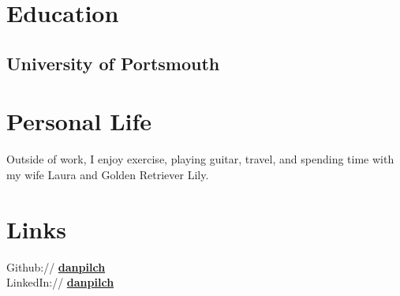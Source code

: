 \documentclass[]{resume}
\begin{document}
\begin{minipage}[t]{0.33\textwidth}

\section{Education}

\subsection{University of Portsmouth}
\sectionsep



\section{Personal Life}
Outside of work, I enjoy exercise, playing guitar, travel, and spending time with my wife Laura and Golden Retriever Lily.
\sectionsep


\section{Links}
Github:// \href{https://github.com/danpilch}{\bf danpilch} \\
LinkedIn://  \href{https://www.linkedin.com/in/danpilch}{\bf danpilch}
\sectionsep

\end{minipage}
\end{document}
